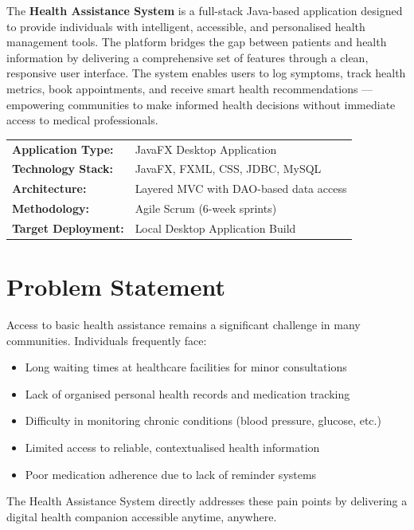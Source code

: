 \documentclass[12pt,a4paper]{report}
\begin{document}
The \textbf{Health Assistance System} is a full-stack Java-based application designed to provide individuals with intelligent, accessible, and personalised health management tools. The platform bridges the gap between patients and health information by delivering a comprehensive set of features through a clean, responsive user interface. The system enables users to log symptoms, track health metrics, book appointments, and receive smart health recommendations --- empowering communities to make informed health decisions without immediate access to medical professionals.

\begin{tcolorbox}[infobox, title={Project at a Glance}]
\begin{tabular}{@{}lp{9cm}@{}}
  \textbf{Application Type:}   & JavaFX Desktop Application \\[3pt]
  \textbf{Technology Stack:}   & JavaFX, FXML, CSS, JDBC, MySQL \\[3pt]
  \textbf{Architecture:}       & Layered MVC with DAO-based data access \\[3pt]
  \textbf{Methodology:}        & Agile Scrum (6-week sprints) \\[3pt]
  \textbf{Target Deployment:}  & Local Desktop Application Build \\
\end{tabular}
\end{tcolorbox}

\section{Problem Statement}

Access to basic health assistance remains a significant challenge in many communities. Individuals frequently face:
\begin{itemize}[leftmargin=1.5cm]
  \item Long waiting times at healthcare facilities for minor consultations
  \item Lack of organised personal health records and medication tracking
  \item Difficulty in monitoring chronic conditions (blood pressure, glucose, etc.)
  \item Limited access to reliable, contextualised health information
  \item Poor medication adherence due to lack of reminder systems
\end{itemize}

The Health Assistance System directly addresses these pain points by delivering a digital health companion accessible anytime, anywhere.
\end{document}
